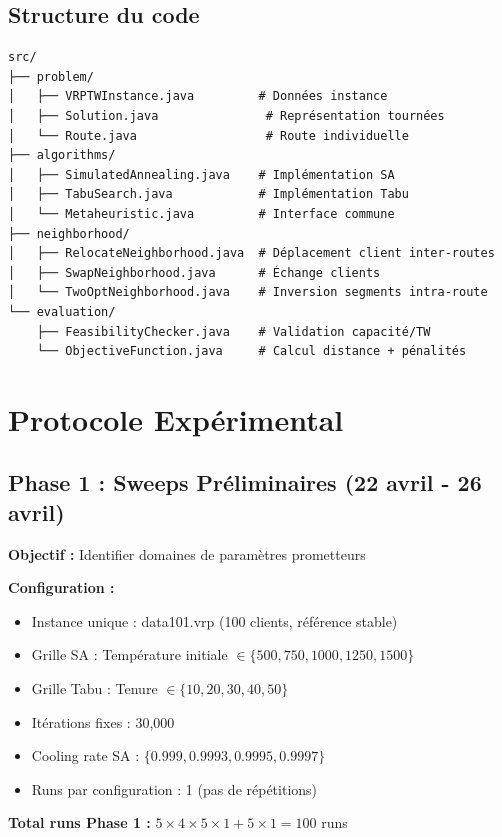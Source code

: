 \documentclass[12pt,a4paper,twoside]{report}
\begin{document}
\subsection{Structure du code}

\begin{verbatim}
src/
├── problem/
│   ├── VRPTWInstance.java         # Données instance
│   ├── Solution.java               # Représentation tournées
│   └── Route.java                  # Route individuelle
├── algorithms/
│   ├── SimulatedAnnealing.java    # Implémentation SA
│   ├── TabuSearch.java            # Implémentation Tabu
│   └── Metaheuristic.java         # Interface commune
├── neighborhood/
│   ├── RelocateNeighborhood.java  # Déplacement client inter-routes
│   ├── SwapNeighborhood.java      # Échange clients
│   └── TwoOptNeighborhood.java    # Inversion segments intra-route
└── evaluation/
    ├── FeasibilityChecker.java    # Validation capacité/TW
    └── ObjectiveFunction.java     # Calcul distance + pénalités
\end{verbatim}

\section{Protocole Expérimental}

\subsection{Phase 1 : Sweeps Préliminaires (22 avril - 26 avril)}

\textbf{Objectif :} Identifier domaines de paramètres prometteurs

\textbf{Configuration :}
\begin{itemize}
    \item Instance unique : data101.vrp (100 clients, référence stable)
    \item Grille SA : Température initiale $\in \{500, 750, 1000, 1250, 1500\}$
    \item Grille Tabu : Tenure $\in \{10, 20, 30, 40, 50\}$
    \item Itérations fixes : 30,000
    \item Cooling rate SA : $\{0.999, 0.9993, 0.9995, 0.9997\}$
    \item Runs par configuration : 1 (pas de répétitions)
\end{itemize}

\textbf{Total runs Phase 1 :} $5 \times 4 \times 5 \times 1 + 5 \times 1 = 100$ runs
\end{document}

